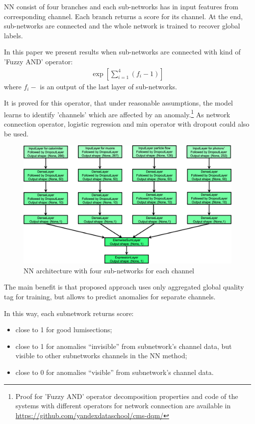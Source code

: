 \documentclass[a4paper]{jpconf}
\begin{document}
NN consist of four branches and each sub-networks has in input features from 
corresponding channel. Each branch returns a score for its channel. At the end, sub-networks are
connected and the whole network is trained to recover global labels.

In this paper we present results when sub-networks are connected with kind of 'Fuzzy AND' operator: \begin{eqnarray}
\exp\left[\sum_{i=1}^4(f_{i} - 1)\right]
\end{eqnarray}
where $f_{i} - $ is an output of the last layer of sub-networks. 

It is proved for this operator, that under reasonable assumptions, the model learns to identify 'channels' which are affected by an anomaly.\footnote{Proof for 'Fuzzy AND' operator decomposition properties and code of the systems with different operators for network connection are available in \url{https://github.com/yandexdataschool/cms-dqm/} } As network connection operator, logistic regression and min operator with dropout could also be used. 

\begin{figure}[h!]
\begin{center}
\includegraphics[width=5in]{figures/net.png}
\end{center}
\caption{\label{fig:nn}NN architecture with four sub-networks for each channel}
\end{figure}


The main benefit is that proposed approach uses only aggregated global quality tag for training, but allows to predict anomalies for separate channels.

In this way, each subnetwork returns score:
\begin{itemize}
\item close to 1 for good lumisections;
\item close to 1 for anomalies “invisible” from subnetwork’s channel data, but visible to other subnetworks channels in the NN method;
\item close to 0 for anomalies “visible” from subnetwork’s channel data.
\end{itemize}
\end{document}
